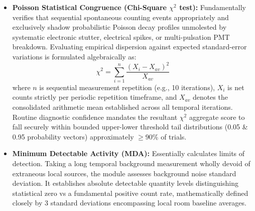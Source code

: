 \begin{itemize}
    \item \textbf{Poisson Statistical Congruence (Chi-Square $\chi^2$ test):} Fundamentally verifies that sequential spontaneous counting events appropriately and exclusively shadow probabilistic Poisson decay profiles unmolested by systematic electronic stutter, electrical spikes, or multi-pulsation PMT breakdown. Evaluating empirical dispersion against expected standard-error variations is formulated algebraically as:
    \begin{equation}
        \chi^2 = \sum_{i=1}^{n} \frac{(X_i - X_{av})^2}{X_{av}}
    \end{equation}
    where $n$ is sequential measurement repetition (e.g., 10 iterations), $X_i$ is net counts strictly per periodic repetition timeframe, and $X_{av}$ denotes the consolidated arithmetic mean established across all temporal iterations. Routine diagnostic confidence mandates the resultant $\chi^2$ aggregate score to fall securely within bounded upper-lower threshold tail distributions (0.05 \& 0.95 probability vectors) approximately $\geq 90\%$ of trials.

    \item \textbf{Minimum Detectable Activity (MDA):} Essentially calculates limits of detection. Taking a long temporal background measurement wholly devoid of extraneous local sources, the module assesses background noise standard deviation. It establishes absolute detectable quantity levels distinguishing statistical zero vs a fundamental positive count rate, mathematically defined closely by 3 standard deviations encompassing local room baseline averages.
\end{itemize}

